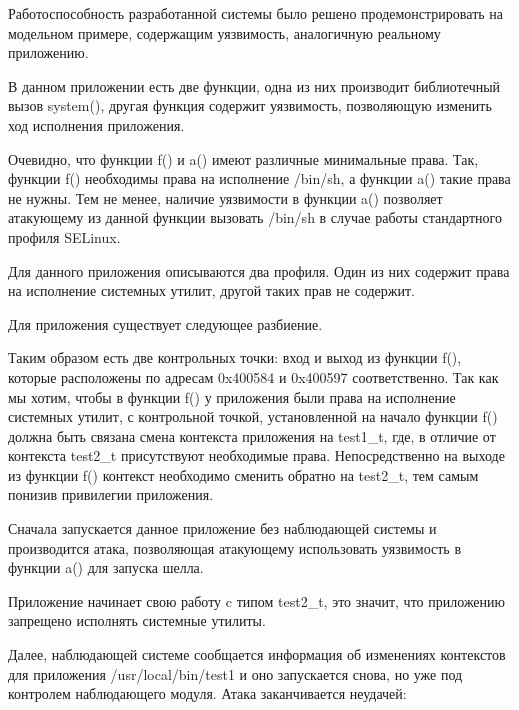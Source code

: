Работоспособность разработанной системы было решено продемонстрировать
на модельном примере, содержащим уязвимость, аналогичную реальному приложению.

В данном приложении есть две функции, одна из них производит
библиотечный вызов system(), другая функция содержит уязвимость,
позволяющую изменить ход исполнения приложения.



Очевидно, что функции f() и a() имеют различные минимальные права.
Так, функции f() необходимы права на исполнение /bin/sh, а функции
a() такие права не нужны. Тем не менее, наличие уязвимости в функции
a() позволяет атакующему из данной функции вызовать /bin/sh в случае
работы стандартного профиля SELinux.

Для данного приложения описываются два профиля. Один из них содержит
права на исполнение системных утилит, другой таких прав не содержит.







Для приложения существует следующее разбиение.

Таким образом есть две контрольных точки: вход и выход из функции f(),
которые расположены по адресам 0x400584 и 0x400597 соответственно.
Так как мы хотим, чтобы в функции f() у приложения были права на
исполнение системных утилит, с контрольной точкой, установленной на
начало функции f() должна быть связана смена контекста приложения на
test1\_t, где, в отличие от контекста test2\_t присутствуют необходимые права.
Непосредственно на выходе из функции f() контекст необходимо сменить обратно на
test2\_t, тем самым понизив привилегии приложения.

Сначала запускается данное приложение без наблюдающей системы
и производится атака, позволяющая атакующему использовать уязвимость в функции
a() для запуска шелла.



Приложение начинает свою работу c типом test2\_t, это значит, что приложению
запрещено исполнять системные утилиты.

Далее, наблюдающей системе сообщается информация об изменениях
контекстов для приложения /usr/local/bin/test1 и оно запускается снова,
но уже под контролем наблюдающего модуля. Атака заканчивается неудачей:

